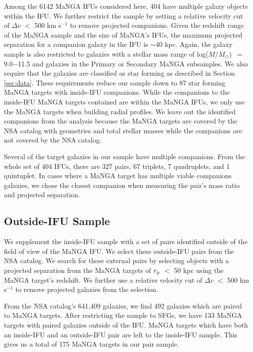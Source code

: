 \documentclass[iop,revtex4,twocolumn,apj,numberedappendix,appendixfloats]{emulateapj}
\newcommand{\logm}{log($M/M_{\odot}$)}
\begin{document}
Among the 6142 MaNGA IFUs considered here, 404 have multiple galaxy objects within the IFU. We further restrict the sample by setting a relative velocity cut of $\Delta v$ $<$ 500 km s$^{-1}$ to remove projected companions. Given the redshift range of the MaNGA sample and the size of MaNGA's IFUs, the maximum projected separation for a companion galaxy in the IFU is $\sim$40 kpc. Again, the galaxy sample is also restricted to galaxies with a stellar mass range of \logm\ $=$ 9.0$-$11.5 and galaxies in the Primary or Secondary MaNGA subsamples. We also require that the galaxies are classified as star forming as described in Section \ref{sec:data}. These requirements reduce our sample down to 87 star forming MaNGA targets with inside-IFU companions. While the companions to the inside-IFU MaNGA targets contained are within the MaNGA IFUs, we only use the MaNGA targets when building radial profiles. We leave out the identified companions from the analysis because the MaNGA targets are covered by the NSA catalog with geometries and total stellar masses while the companions are not covered by the NSA catalog. 

Several of the target galaxies in our sample have multiple companions. From the whole set of 404 IFUs, there are 327 pairs, 67 triplets, 7 quadruplets, and 1 quintuplet. In cases where a MaNGA target has multiple viable companions galaxies, we chose the closest companion when measuring the pair's mass ratio and projected separation. 

\subsection{Outside-IFU Sample}\label{sec:outside}

We supplement the inside-IFU sample with a set of pairs identified outside of the field of view of the MaNGA IFU. We select these outside-IFU pairs from the NSA catalog. We search for these external pairs by selecting objects with a projected separation from the MaNGA targets of $r_{\rm p}$ $<$ 50 kpc using the MaNGA target's redshift. We further use a relative velocity cut of $\Delta v$ $<$ 500 km s$^{-1}$ to remove projected galaxies from the selection. 

From the NSA catalog's 641,409 galaxies, we find 492 galaxies which are paired to MaNGA targets. After restricting the sample to SFGs, we have 133 MaNGA targets with paired galaxies outside of the IFU. MaNGA targets which have both an inside-IFU and an outside-IFU pair are left to the inside-IFU sample. This gives us a total of 175 MaNGA targets in our pair sample.
\end{document}
